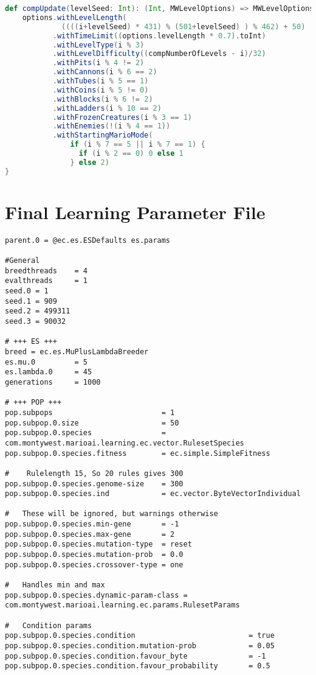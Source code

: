\begin{appendices}
\begin{minipage}{0.9\linewidth}
\begin{lstlisting}[language=scala, basicstyle=\scriptsize\ttfamily, caption=Parameter classes for the comparator task described in Section \ref{subsec:comptask}]
def compUpdate(levelSeed: Int): (Int, MWLevelOptions) => MWLevelOptions = (i: Int, options: MWLevelOptions) => {
    options.withLevelLength(
             ((((i+levelSeed) * 431) % (501+levelSeed) ) % 462) + 50)
           .withTimeLimit((options.levelLength * 0.7).toInt)
           .withLevelType(i % 3)
           .withLevelDifficulty((compNumberOfLevels - i)/32)
           .withPits(i % 4 != 2)
           .withCannons(i % 6 == 2)
           .withTubes(i % 5 == 1)
           .withCoins(i % 5 != 0)
           .withBlocks(i % 6 != 2)
           .withLadders(i % 10 == 2)
           .withFrozenCreatures(i % 3 == 1)
           .withEnemies(!(i % 4 == 1))
           .withStartingMarioMode(
               if (i % 7 == 5 || i % 7 == 1) {
                 if (i % 2 == 0) 0 else 1
               } else 2)
}
\end{lstlisting}
\end{minipage}


\section{Final Learning Parameter File}
\label{app:paramfile}

\begin{minipage}{0.9\linewidth}
\begin{lstlisting}
parent.0 = @ec.es.ESDefaults es.params

#General
breedthreads 	= 4
evalthreads 	= 1
seed.0 = 1
seed.1 = 909
seed.2 = 499311
seed.3 = 90032

# +++ ES +++
breed = ec.es.MuPlusLambdaBreeder
es.mu.0 		= 5
es.lambda.0 	= 45
generations 	= 1000

# +++ POP +++
pop.subpops 						= 1
pop.subpop.0.size 					= 50
pop.subpop.0.species 				= com.montywest.marioai.learning.ec.vector.RulesetSpecies
pop.subpop.0.species.fitness		= ec.simple.SimpleFitness

#	 Rulelength 15, So 20 rules gives 300
pop.subpop.0.species.genome-size 	= 300
pop.subpop.0.species.ind 			= ec.vector.ByteVectorIndividual

#	These will be ignored, but warnings otherwise 
pop.subpop.0.species.min-gene		= -1
pop.subpop.0.species.max-gene		= 2
pop.subpop.0.species.mutation-type	= reset
pop.subpop.0.species.mutation-prob  = 0.0
pop.subpop.0.species.crossover-type = one

#	Handles min and max
pop.subpop.0.species.dynamic-param-class = com.montywest.marioai.learning.ec.params.RulesetParams

#	Condition params
pop.subpop.0.species.condition							= true
pop.subpop.0.species.condition.mutation-prob 			= 0.05
pop.subpop.0.species.condition.favour_byte 				= -1
pop.subpop.0.species.condition.favour_probability 		= 0.5


\end{lstlisting}
\end{minipage}
\end{appendices}
